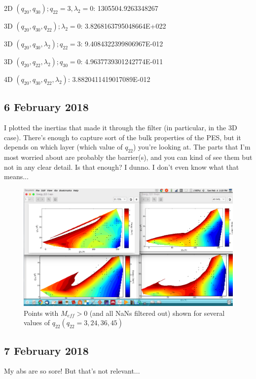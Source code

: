 \documentclass[]{report}
\begin{document}
\begin{list}{}{Half-lives in 2, 3, and 4 dimensions:}
\item 2D $(q_{20},q_{30}); q_{22}=3, \lambda_2=0$:    1305504.9263348267     
\item 3D $(q_{20},q_{30},q_{22}); \lambda_2=0$:    3.8268163795048664E+022
\item 3D $(q_{20},q_{30},\lambda_2); q_{22}=3$:    9.4084322399806967E-012
\item 3D $(q_{20},q_{22},\lambda_2); q_{30}=0$:    4.9637739301242774E-011
\item 4D $(q_{20},q_{30},q_{22},\lambda_2)$:       3.8820411419017089E-012
\end{list}

\subsection*{6 February 2018}
I plotted the inertias that made it through the filter (in particular, in the 3D case). There's enough to capture sort of the bulk properties of the PES, but it depends on which layer (which value of $q_{22}$) you're looking at. The parts that I'm most worried about are probably the barrier(s), and you can kind of see them but not in any clear detail. Is that enough? I dunno. I don't even know what that means...
\begin{figure}
\centering
\includegraphics[width=0.9\linewidth]{post_filtering_nans}
\caption[Points with $M_{eff}>0$]{Points with $M_{eff}>0$ (and all NaNs filtered out) shown for several values of $q_{22} (q_{22}=3,24,36,45)$}
\label{fig:post_filtering_nans}
\end{figure}

\subsection*{7 February 2018}
My abs are so sore! But that's not relevant...
\end{document}
